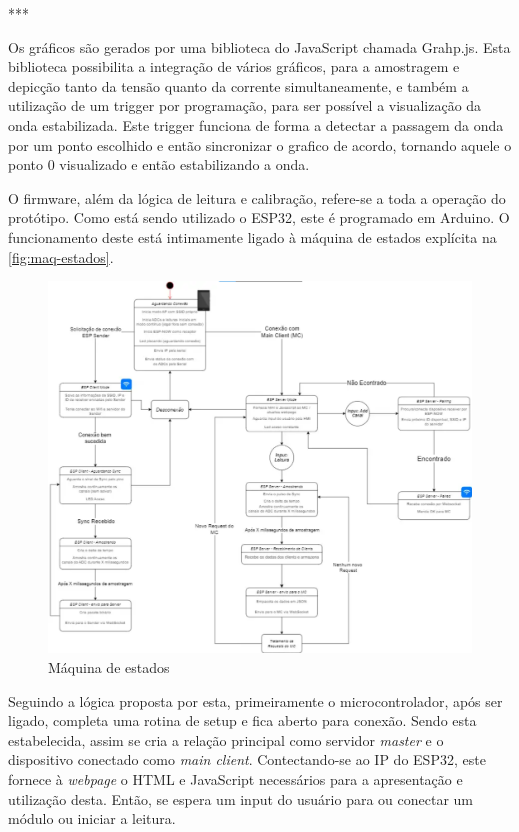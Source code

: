 ***

Os gráficos são gerados por uma biblioteca do JavaScript chamada Grahp.js. Esta biblioteca possibilita a integração de vários gráficos, para a amostragem e depicção tanto da tensão quanto da corrente simultaneamente, e também a utilização de um trigger por programação, para ser possível a visualização da onda estabilizada. Este trigger funciona de forma a detectar a passagem da onda por um ponto escolhido e então sincronizar o grafico de acordo, tornando aquele o ponto 0 visualizado e então estabilizando a onda.



O firmware, além da lógica de leitura e calibração, refere-se a toda a operação do protótipo. Como está sendo utilizado o ESP32, este é programado em Arduino. O funcionamento deste está intimamente ligado à máquina de estados explícita na \autoref{fig:maq-estados}.

\begin{figure}[htb!]
    \caption{Máquina de estados}
    \label{fig:maq-estados}
    \includegraphics[width=1.0\textwidth]{figuras/maq-estados.png}
    \fonte{}
\end{figure}

Seguindo a lógica proposta por esta, primeiramente o microcontrolador, após ser ligado, completa uma rotina de setup e fica aberto para conexão. Sendo esta estabelecida, assim se cria a relação principal como servidor \textit{master} e o dispositivo conectado como \textit{main client}. Contectando-se ao IP do ESP32, este fornece à \textit{webpage} o HTML e JavaScript necessários para a apresentação e utilização desta. Então, se espera um input do usuário para ou conectar um módulo ou iniciar a leitura.


